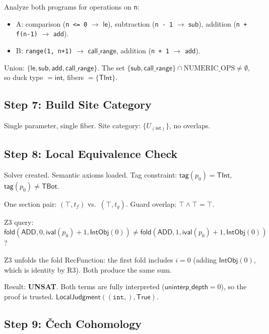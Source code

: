 \documentclass[11pt,a4paper]{report}
\theoremstyle{definition}
\theoremstyle{plain}
\newcommand{\fold}{\mathsf{fold}}
\begin{document}
Analyze both programs for operations on \texttt{n}:
\begin{itemize}
  \item A: comparison (\texttt{n <= 0} $\to$ $\mathsf{le}$),
    subtraction (\texttt{n - 1} $\to$ $\mathsf{sub}$),
    addition (\texttt{n + f(n-1)} $\to$ $\mathsf{add}$).
  \item B: \texttt{range(1, n+1)} $\to$ $\mathsf{call\_range}$,
    addition (\texttt{n + 1} $\to$ $\mathsf{add}$).
\end{itemize}

Union: $\{\mathsf{le}, \mathsf{sub}, \mathsf{add},
\mathsf{call\_range}\}$.  The set $\{\mathsf{sub},
\mathsf{call\_range}\} \cap \mathrm{NUMERIC\_OPS} \neq \emptyset$,
so duck type $= \mathsf{int}$, fibers $= \{\mathsf{TInt}\}$.

\subsection{Step 7: Build Site Category}

Single parameter, single fiber.  Site category:
$\{U_{(\mathsf{int})}\}$, no overlaps.

\subsection{Step 8: Local Equivalence Check}

Solver created.  Semantic axioms loaded.  Tag constraint:
$\mathsf{tag}(p_0) = \mathsf{TInt}$,
$\mathsf{tag}(p_0) \neq \mathsf{TBot}$.

One section pair: $(\top, t_f)$ vs.\ $(\top, t_g)$.
Guard overlap: $\top \land \top = \top$.

Z3 query: $\fold(\mathsf{ADD}, 0, \mathsf{ival}(p_0)+1,
\mathsf{IntObj}(0)) \neq \fold(\mathsf{ADD}, 1,
\mathsf{ival}(p_0)+1, \mathsf{IntObj}(0))$?

Z3 unfolds the fold RecFunction: the first fold includes $i=0$
(adding $\mathsf{IntObj}(0)$, which is identity by R3).
Both produce the same sum.

Result: \textbf{UNSAT}.  Both terms are fully interpreted
($\mathsf{uninterp\_depth} = 0$), so the proof is trusted.
$\mathsf{LocalJudgment}((\texttt{int},), \mathsf{True})$.

\subsection{Step 9: \v{C}ech Cohomology}
\end{document}
